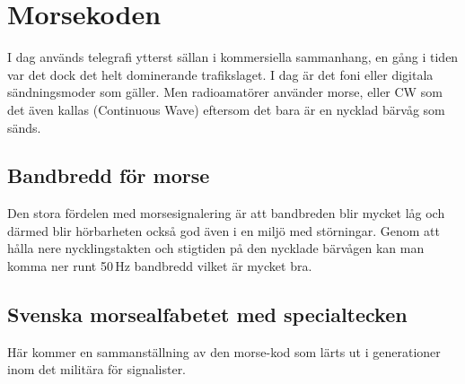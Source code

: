 \clearpage

\section{Morsekoden}

I dag används telegrafi ytterst sällan i kommersiella sammanhang, en gång i
tiden var det dock det helt dominerande trafikslaget. I dag är det foni eller
digitala sändningsmoder som gäller. Men radioamatörer använder morse, eller CW
som det även kallas (Continuous Wave) eftersom det bara är en nycklad bärvåg
som sänds.

\subsection{Bandbredd för morse}

Den stora fördelen med morsesignalering är att bandbreden blir mycket låg och
därmed blir hörbarheten också god även i en miljö med störningar. Genom att
hålla nere nycklingstakten och stigtiden på den nycklade bärvågen kan man
komma ner runt 50\,Hz bandbredd vilket är mycket bra.

\subsection{Svenska morsealfabetet med specialtecken}
Här kommer en sammanställning av den morse-kod som lärts ut i
generationer inom det militära för signalister.

